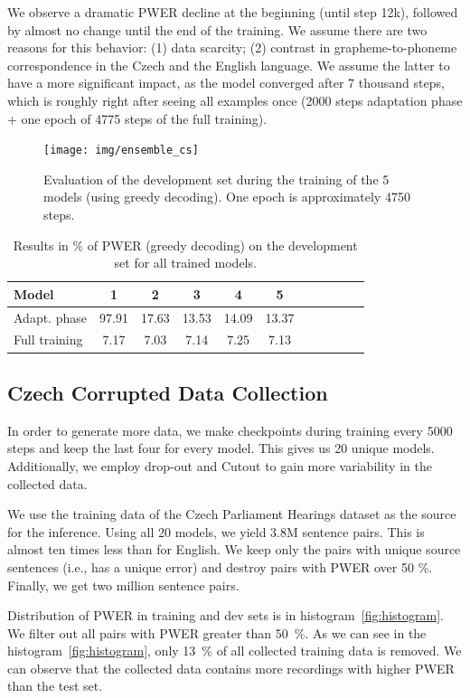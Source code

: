 We observe a dramatic PWER decline at the beginning (until step 12k), followed by almost no change until the end of the training. We assume there are two reasons for this behavior: (1) data scarcity; (2) contrast in grapheme-to-phoneme correspondence in the Czech and the English language. We assume the latter to have a more significant impact, as the model converged after 7 thousand steps, which is roughly right after seeing all examples once (2000 steps adaptation phase + one epoch of 4775 steps of the full training).

\begin{figure}[h]
	\texttt{[image: img/ensemble\_cs]}
	\caption{Evaluation of the development set during the training of the 5 models (using greedy decoding). One epoch is approximately 4750 steps.}
	\label{fig:ensemble_training_cs}
\end{figure}

\begin{table}[h]
	\centering
	\begin{tabular}{l|cccccccccc}
		\bf Model & \bf 1 & \bf 2 & \bf 3 & 4 & \bf 5  \\
		\hline 
		
		Adapt. phase &
		97.91 &
		17.63 &
		13.53 &
		14.09 &
		13.37 \\
		Full training &
		7.17 &
		7.03 &
		7.14 &
		7.25 &
		7.13 
		
	\end{tabular}
	\caption{Results in \% of PWER (greedy decoding) on the development set for all trained models.}
	\label{tab:cs_folds}
\end{table}

\subsection{Czech Corrupted Data Collection}
In order to generate more data, we make checkpoints during training every 5000 steps and keep the last four for every model. This gives us 20 unique models. Additionally, we employ drop-out and Cutout to gain more variability in the collected data.

We use the training data of the Czech Parliament Hearings dataset as the source for the inference. Using all 20 models, we yield 3.8M sentence pairs. This is almost ten times less than for English. We keep only the pairs with unique source sentences (i.e., has a unique error) and destroy pairs with PWER over 50 \%. Finally, we get two million sentence pairs.

Distribution of PWER in training and dev sets is in histogram~\ref{fig:histogram}. We filter out all pairs with PWER greater than 50~\%. As we can see in the histogram~\ref{fig:histogram}, only 13~\% of all collected training data is removed. We can observe that the collected data contains more recordings with higher PWER than the test set. 

